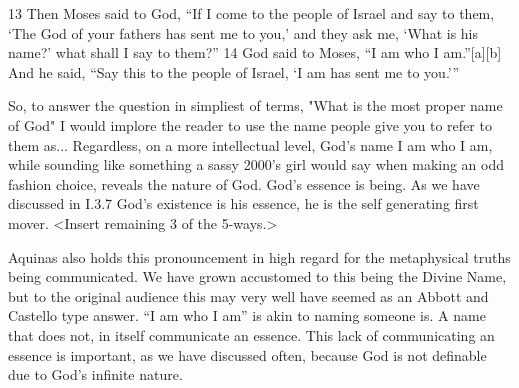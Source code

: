 \documentclass{ucetd}
\begin{document}
13 Then Moses said to God, “If I come to the people of Israel and say to them, ‘The God of your fathers has sent me to you,’ and they ask me, ‘What is his name?’ what shall I say to them?” 14 God said to Moses, “I am who I am.”[a][b] And he said, “Say this to the people of Israel, ‘I am has sent me to you.’” 

So, to answer the question in simpliest of terms, "What is the most proper name of God" I would implore the reader to use the name people give you to refer to them as... Regardless, on a more intellectual level, God's name I am who I am, while sounding like something a sassy 2000's girl would say when making an odd fashion choice, reveals the nature of God. God's essence is being. As we have discussed in I.3.7 God's existence is his essence, he is the self generating first mover. <Insert remaining 3 of the 5-ways.>

Aquinas also holds this pronouncement in high regard for the metaphysical truths being communicated. We have grown accustomed to this being the Divine Name, but to the original audience this may very well have seemed as an Abbott and Castello type answer. ``I am who I am'' is akin to naming someone is. A name that does not, in itself communicate an essence. This lack of communicating an essence is important, as we have discussed often, because God is not definable due to God's infinite nature.
\end{document}
